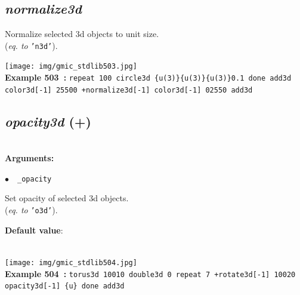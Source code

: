 \documentclass[a4paper,10.5pt,twoside]{book}
\def\comma{\discretionary{,}{}{,}}
\newcommand{\Cb}[1]{\textcolor{cb}{#1}}
\newcommand{\Cc}[1]{\textcolor{cc}{#1}}
\begin{document}
\subsection{\emph{normalize3d} }\vspace*{-0.7em}
Normalize selected 3d objects to unit size.
~\\(\emph{eq. to} {\small \texttt{'n3d'}}).
\begin{center}\texttt{[image: img/gmic\_stdlib503.jpg]}\\
{\footnotesize \textbf{Example 503~:} \texttt{repeat 100 circle3d \{u(3)\}{\comma}\{u(3)\}{\comma}\{u(3)\}{\comma}0.1 done add3d color3d[-1] 255{\comma}0{\comma}0 +normalize3d[-1] color3d[-1] 0{\comma}255{\comma}0 add3d}}
\end{center}

\subsection{\emph{opacity3d} (+)}\vspace*{-0.7em}
~\\\textbf{\Cb{Arguments: }}\begin{flushleft}
{\small \Cb{\hspace*{0.5cm}$\bullet$~~\texttt{\_opacity}}}\end{flushleft}
Set opacity of selected 3d objects.
~\\(\emph{eq. to} {\small \texttt{'o3d'}}).
\begin{flushleft}\Cc{\textbf{Default value}:\\~\\\hspace*{0.5cm}{\small $\bullet$~~\texttt{'opacity=1'.}}}\end{flushleft}
\begin{center}\texttt{[image: img/gmic\_stdlib504.jpg]}\\
{\footnotesize \textbf{Example 504~:} \texttt{torus3d 100{\comma}10 double3d 0 repeat 7 +rotate3d[-1] 1{\comma}0{\comma}0{\comma}20 opacity3d[-1] \{u\} done add3d}}
\end{center}
\end{document}
